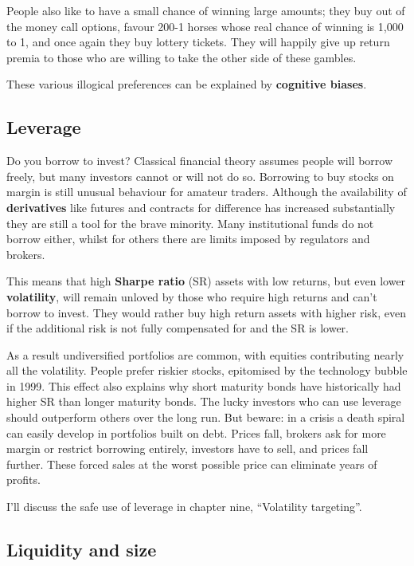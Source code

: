 People also like to have a small chance of winning large amounts; they buy out of the money call options, favour 200-1 horses whose real chance of winning is 1,000 to 1, and once again they buy lottery tickets. They will happily give up return premia to those who are willing to take the other side of these gambles.

These various illogical preferences can be explained by \textbf{cognitive biases}.

\subsection*{Leverage}

Do you borrow to invest? Classical financial theory assumes people will borrow freely, but many investors cannot or will not do so. Borrowing to buy stocks on margin is still unusual behaviour for amateur traders. Although the availability of \textbf{derivatives} like futures and contracts for difference has increased substantially they are still a tool for the brave minority. Many institutional funds do not borrow either, whilst for others there are limits imposed by regulators and brokers.

This means that high \textbf{Sharpe ratio} (SR) assets with low returns, but even lower \textbf{volatility}, will remain unloved by those who require high returns and can't borrow to invest. They would rather buy high return assets with higher risk, even if the additional risk is not fully compensated for and the SR is lower.

As a result undiversified portfolios are common, with equities contributing nearly all the volatility. People prefer riskier stocks, epitomised by the technology bubble in 1999. This effect also explains why short maturity bonds have historically had higher SR than longer maturity bonds. The lucky investors who can use leverage should outperform others over the long run. But beware: in a crisis a death spiral can easily develop in portfolios built on debt. Prices fall, brokers ask for more margin or restrict borrowing entirely, investors have to sell, and prices fall further. These forced sales at the worst possible price can eliminate years of profits.

I'll discuss the safe use of leverage in chapter nine, ``Volatility targeting''.

\subsection*{Liquidity and size}

